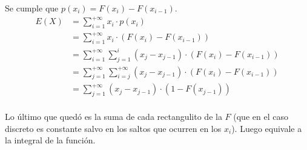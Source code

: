 \begin{enumerate}
\begin{enumerate}
				Se cumple que $p(x_i) = F(x_i) - F(x_{i-1})$.
				\begin{align*}
					E(X)	& = \sum_{i=1}^{+\infty} x_i\cdot{p(x_i)}				\\
							& = \sum_{i=1}^{+\infty} x_i\cdot(F(x_i) - F(x_{i-1}))	\\
							& = \sum_{i=1}^{+\infty} \sum_{j=1}^{i} (x_j - x_{j-1})\cdot(F(x_i) - F(x_{i-1}))		\\
							& = \sum_{j=1}^{+\infty} \sum_{i=j}^{+\infty} (x_j - x_{j-1})\cdot(F(x_i) - F(x_{i-1}))	\\
							& = \sum_{j=1}^{+\infty} (x_j - x_{j-1})\cdot(1 - F(x_{j-1}))							\\
				\end{align*}
				
				Lo último que quedó es la suma de cada rectangulito de la $F$ (que en el caso discreto es constante salvo en los saltos que ocurren en los $x_i$).
				Luego equivale a la integral de la función.
		\end{enumerate}

\end{enumerate}

